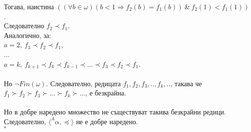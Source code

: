 \documentclass[french]{article}
\begin{document}
	Тогава, наистина $((\forall b \in \omega)(b < 1 \Rightarrow f_2(b) = f_1(b))\ \&\ f_2(1) < f_1(1))$. \\
	Следователно $f_2 \prec f_1$. \\
	Аналогично, за: \\
	$a = 2,\ f_3 \prec f_2 \prec f_1$, \\
	... \\
	$a = k,\ f_{k+1} \prec f_k \prec f_{k-1} \prec ... \prec f_3 \prec f_2 \prec f_1$. \\
	\\
	Но $\neg Fin(\omega)$. Следователно, редицата $f_1, f_2, f_3, .., f_k, ..$, такава че \\
	$f_1 \succ f_2 \succ f_3 \succ ... \succ f_k \succ ...$, е безкрайна. \\
	\\
	Но в добре наредено множество не съществуват такива безкрайни редици. \\
	Следователно, $\langle ^A\!\alpha, \preceq \rangle$ не е добре наредено. \\
	$\square$
\end{document}
